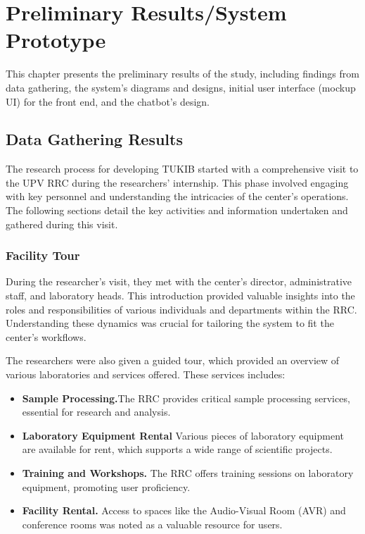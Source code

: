 \chapter{Preliminary Results/System Prototype}
This chapter presents the preliminary results of the study, including findings from data gathering, the system's diagrams and designs, initial user interface (mockup UI) for the front end, and the chatbot's design.

\section{Data Gathering Results}
The research process for developing TUKIB started with a comprehensive visit to the UPV RRC during the researchers' internship. This phase involved engaging with key personnel and understanding the intricacies of the center's operations. The following sections detail the key activities and information undertaken and gathered during this visit.

\subsection{Facility Tour}
During the researcher's visit, they met with the center's director, administrative staff, and laboratory heads. This introduction provided valuable insights into the roles and responsibilities of various individuals and departments within the RRC. Understanding these dynamics was crucial for tailoring the system to fit the center’s workflows.

The researchers were also given a guided tour, which provided an overview of various laboratories and services offered. These services includes:

\begin{itemize}
	\item \textbf{Sample Processing.}The RRC provides critical sample processing services, essential for research and analysis.
	\item \textbf{Laboratory Equipment Rental} Various pieces of laboratory equipment are available for rent, which supports a wide range of scientific projects.
	\item \textbf{Training and Workshops.} The RRC offers training sessions on laboratory equipment, promoting user proficiency.
	\item \textbf{Facility Rental.} Access to spaces like the Audio-Visual Room (AVR) and conference rooms was noted as a valuable resource for users.
\end{itemize}

